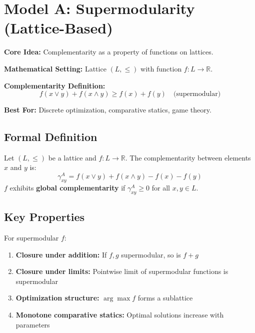 \section{Model A: Supermodularity (Lattice-Based)}
\label{sec:model-a}

\begin{tcolorbox}[colback=green!5!white,colframe=green!75!black,title=\textbf{Model A Overview}]
\textbf{Core Idea:} Complementarity as a property of functions on lattices.

\textbf{Mathematical Setting:} Lattice $(L, \leq)$ with function $f: L \to \mathbb{R}$.

\textbf{Complementarity Definition:}
\begin{equation}
f(x \vee y) + f(x \wedge y) \geq f(x) + f(y) \quad \text{(supermodular)}
\end{equation}

\textbf{Best For:} Discrete optimization, comparative statics, game theory.
\end{tcolorbox}

\subsection{Formal Definition}

\begin{definition}
Let $(L, \leq)$ be a lattice and $f: L \to \mathbb{R}$. The complementarity between elements $x$ and $y$ is:
\begin{equation}
\gamma^A_{xy} = f(x \vee y) + f(x \wedge y) - f(x) - f(y)
\label{eq:model-a}
\end{equation}
$f$ exhibits \textbf{global complementarity} if $\gamma^A_{xy} \geq 0$ for all $x, y \in L$.
\end{definition}

\subsection{Key Properties}

\begin{theorem}
For supermodular $f$:
\begin{enumerate}
    \item \textbf{Closure under addition:} If $f, g$ supermodular, so is $f + g$
    \item \textbf{Closure under limits:} Pointwise limit of supermodular functions is supermodular
    \item \textbf{Optimization structure:} $\arg\max f$ forms a sublattice
    \item \textbf{Monotone comparative statics:} Optimal solutions increase with parameters
\end{enumerate}
\end{theorem}

